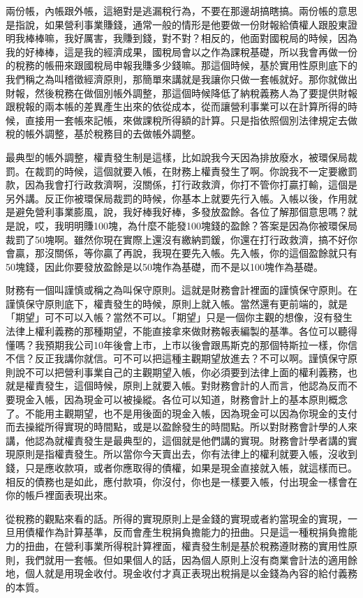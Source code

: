 \documentclass[]{ctexbook}
\begin{document}
兩份帳，內帳跟外帳，這絕對是逃漏稅行為，不要在那邊胡搞瞎搞。兩份帳的意思是指說，如果營利事業賺錢，通常一般的情形是他要做一份財報給債權人跟股東證明我棒棒嘛，我好厲害，我賺到錢，對不對？相反的，他面對國稅局的時候，因為我的好棒棒，這是我的經濟成果，國稅局會以之作為課稅基礎，所以我會再做一份的稅務的帳冊來跟國稅局申報我賺多少錢嘛。那這個時候，基於實用性原則底下的我們稱之為叫稽徵經濟原則，那簡單來講就是我讓你只做一套帳就好。那你就做出財報，然後稅務在做個別帳外調整，那這個時候降低了納稅義務人為了要提供財報跟稅報的兩本帳的差異產生出來的依從成本，從而讓營利事業可以在計算所得的時候，直接用一套帳來記帳，來做課稅所得額的計算。只是指依照個別法律規定去做稅的帳外調整，基於稅務目的去做帳外調整。

最典型的帳外調整，權責發生制是這樣，比如說我今天因為排放廢水，被環保局裁罰。在裁罰的時候，這個就要入帳，在財務上權責發生了啊。你說我不一定要繳罰款，因為我會打行政救濟啊，沒關係，打行政救濟，你打不管你打贏打輸，這個是另外講。反正你被環保局裁罰的時候，你基本上就要先行入帳。入帳以後，作用就是避免營利事業膨風，說，我好棒我好棒，多發放盈餘。各位了解那個意思嗎？就是說，哎，我明明賺100塊，為什麼不能發100塊錢的盈餘？答案是因為你被環保局裁罰了50塊啊。雖然你現在實際上還沒有繳納罰鍰，你還在打行政救濟，搞不好你會贏，那沒關係，等你贏了再說，我現在要先入帳。先入帳，你的這個盈餘就只有50塊錢，因此你要發放盈餘是以50塊作為基礎，而不是以100塊作為基礎。

財務有一個叫謹慎或稱之為叫保守原則。這就是財務會計裡面的謹慎保守原則。在謹慎保守原則底下，權責發生的時候，原則上就入帳。當然還有更前端的，就是「期望」可不可以入帳？當然不可以。「期望」只是一個你主觀的想像，沒有發生法律上權利義務的那種期望，不能直接拿來做財務報表編製的基準。各位可以聽得懂嗎？我預期我公司10年後會上市，上市以後會跟馬斯克的那個特斯拉一樣，你信不信？反正我講你就信。可不可以把這種主觀期望放進去？不可以啊。謹慎保守原則說不可以把營利事業自己的主觀期望入帳，你必須要到法律上面的權利義務，也就是權責發生，這個時候，原則上就要入帳。對財務會計的人而言，他認為反而不要現金入帳，因為現金可以被操縱。各位可以知道，財務會計上的基本原則概念了。不能用主觀期望，也不是用後面的現金入帳，因為現金可以因為你現金的支付而去操縱所得實現的時間點，或是以盈餘發生的時間點。所以對財務會計學的人來講，他認為就權責發生是最典型的，這個就是他們講的實現。財務會計學者講的實現原則是指權責發生。所以當你今天賣出去，你有法律上的權利就要入帳，沒收到錢，只是應收款項，或者你應取得的債權，如果是現金直接就入帳，就這樣而已。相反的債務也是如此，應付款項，你沒付，你也是一樣要入帳，付出現金一樣會在你的帳戶裡面表現出來。

從稅務的觀點來看的話。所得的實現原則上是金錢的實現或者約當現金的實現，一旦用債權作為計算基準，反而會產生稅捐負擔能力的扭曲。只是這一種稅捐負擔能力的扭曲，在營利事業所得稅計算裡面，權責發生制是基於稅務遵財務的實用性原則，我們就用一套帳。但如果個人的話，因為個人原則上沒有商業會計法的適用餘地，個人就是用現金收付。現金收付才真正表現出稅捐是以金錢為內容的給付義務的本質。
\end{document}
